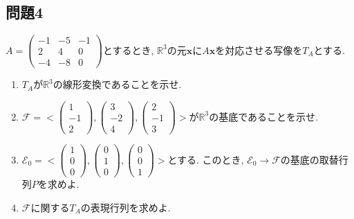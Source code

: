 \documentclass[a4j,dvipdfmx]{jsarticle}
\newcommand{\R}{\mathbb{R}}
\newcommand{\E}{\mathcal{E}}
\newcommand{\F}{\mathcal{F}}
\begin{document}
    \subsection*{問題4}
        $A=\begin{pmatrix}-1 & -5 & -1\\2 & 4 & 0\\-4 & -8 & 0\end{pmatrix}$とするとき, $\R^3$の元$\bm{x}$に$A\bm{x}$を対応させる写像を$T_A$とする.
        \begin{enumerate}
            \item $T_A$が$\R^3$の線形変換であることを示せ.
            \item $\F = <\begin{pmatrix}1\\-1\\2\end{pmatrix},\begin{pmatrix}3\\-2\\4\end{pmatrix},\begin{pmatrix}2\\-1\\3\end{pmatrix}>$が$\R^3$の基底であることを示せ.
            \item $\E_0 = <\begin{pmatrix}1\\0\\0\end{pmatrix},\begin{pmatrix}0\\1\\0\end{pmatrix},\begin{pmatrix}0\\0\\1\end{pmatrix}>$とする. このとき, $\E_0\to\F$の基底の取替行列$P$を求めよ.
            \item $\F$に関する$T_A$の表現行列を求めよ.
        \end{enumerate}
\end{document}
